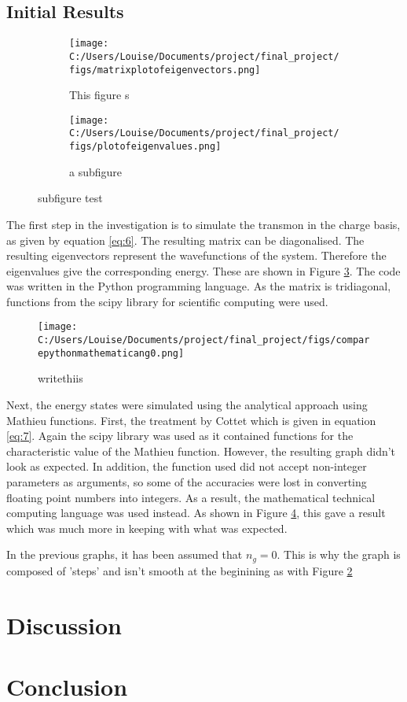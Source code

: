 \documentclass[11pt]{article}
\begin{document}
\subsection{Initial Results}
\begin{figure}[ht]
\centering
\begin{subfigure}{.5\linewidth}
\centering
\texttt{[image: C:/Users/Louise/Documents/project/final\_project/figs/matrixplotofeigenvectors.png]}
\caption{This figure s}
\label{fig:subgraph1}
\end{subfigure}%
\begin{subfigure}{.5\linewidth}
\centering
\texttt{[image: C:/Users/Louise/Documents/project/final\_project/figs/plotofeigenvalues.png]}
\caption{a subfigure}
\label{fig:subgraph2}
\end{subfigure}
\caption{subfigure test}
\label{fig:graph1}
\end{figure}
The first step in the investigation is to simulate the transmon in the charge basis, as given by equation \ref{eq:6}. The resulting matrix can be diagonalised. The resulting eigenvectors represent the wavefunctions of the system. Therefore the eigenvalues give the corresponding energy. These are shown in Figure \ref{fig:graph1}. The code was written in the Python programming language. As the matrix is tridiagonal, functions from the scipy library for scientific computing were used.
\begin{figure} 
\centering
\texttt{[image: C:/Users/Louise/Documents/project/final\_project/figs/comparepythonmathematicang0.png]}
\caption{writethiis}
\label{fig:graph2}
\end{figure}
Next, the energy states were simulated using the analytical approach using Mathieu functions. First, the treatment by Cottet which is given in equation \ref{eq:7}. Again the scipy library was used as it contained functions for the characteristic value of the Mathieu function. However, the resulting graph didn't look as expected. In addition, the function used did not accept non-integer parameters as arguments, so some of the accuracies were lost in converting floating point numbers into integers. As a result, the mathematical technical computing language was used instead. As shown in Figure \ref{fig:graph2}, this gave a result which was much more in keeping with what was expected.

In the previous graphs, it has been assumed that $n_g = 0$. This is why the graph is composed of 'steps' and isn't smooth at the beginining as with Figure \ref{fig:subgraph2}

    \section{Discussion}

    \section{Conclusion}
\end{document}
